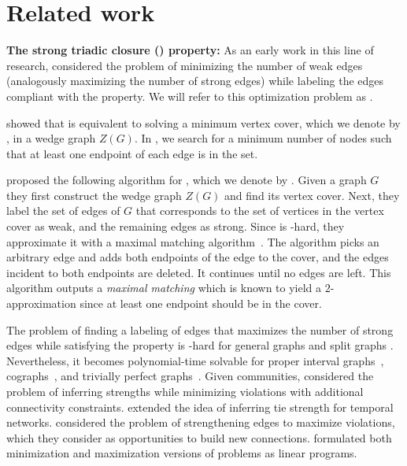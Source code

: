 \section{Related work}\label{sec:related}

\textbf{The strong triadic closure (\stc) property:}
As an early work in this line of research, \citet{sintos2014using} considered the problem of minimizing the number of weak edges (analogously maximizing the number of strong edges) while labeling the edges compliant with the \stc property.
We will refer to this optimization problem as \prbminSTC.

\citet{sintos2014using} showed
that \prbminSTC is equivalent to solving a minimum vertex cover, which we denote by \prbcovermin, in a wedge graph $Z(G)$.
In \prbcovermin, we search for a minimum number of nodes such that at least one endpoint of each edge is in the set.

\citet{sintos2014using} proposed the following algorithm for \prbminSTC, which we denote by \algminstc.
Given a graph $G$ they first construct the wedge graph $Z(G)$ and find its vertex cover. Next, they label the set of edges of $G$ that corresponds to the set of vertices in the vertex cover as weak, and the remaining edges as strong. Since \prbcovermin is \np-hard, they approximate it with a maximal matching algorithm~\citep{clarkson1983modification}. The algorithm picks an arbitrary edge and adds both endpoints of the edge to the cover, and the edges incident to both endpoints are deleted. It continues until no edges are left. This algorithm outputs a {\em maximal matching} which is known to yield a $2$-approximation since at least one endpoint should be in the cover.

The problem of finding a labeling of edges that maximizes the number of strong edges while satisfying the \stc property is \np-hard for general graphs \cite{sintos2014using} and split graphs \cite{konstantinidis2020maximizing}. 
Nevertheless, it becomes polynomial-time solvable for proper interval
graphs~\cite{konstantinidis2020maximizing}, cographs~\cite{konstantinidis2018strong}, and trivially perfect graphs~\cite{konstantinidis2020maximizing}.
Given communities, \citet{rozenshtein2017inferring} considered the problem of inferring strengths while minimizing \stc violations with additional connectivity constraints.
\citet{oettershagen2022inferring} extended the idea of inferring tie strength for temporal networks.
\citet{matakos2022strengthening} considered the problem of strengthening edges to maximize \stc violations, which they consider as opportunities to build new connections.
\citet{adriaens2020relaxing} formulated both minimization and maximization versions of \stc problems as linear programs.

